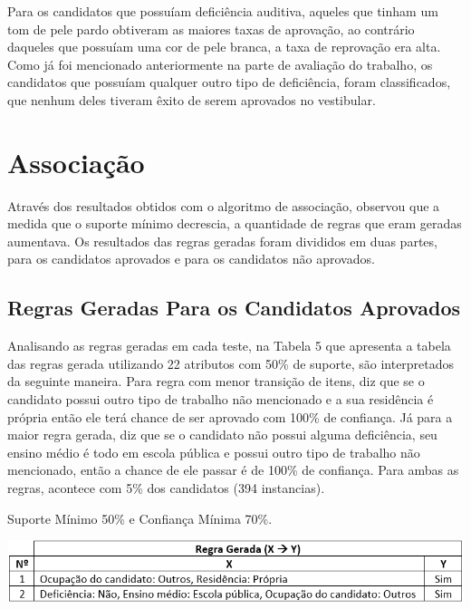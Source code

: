 \par
Para os candidatos que possuíam deficiência auditiva, aqueles que tinham um tom de pele pardo obtiveram as maiores taxas de aprovação, ao contrário daqueles que possuíam uma cor de pele branca, a taxa de reprovação era alta. Como já foi mencionado anteriormente na parte de avaliação do trabalho, os candidatos que possuíam qualquer outro tipo de deficiência, foram classificados, que nenhum deles tiveram êxito de serem aprovados no vestibular.


\section{Associação}

Através dos resultados obtidos com o algoritmo de associação, observou que a medida que o suporte mínimo decrescia, a quantidade de regras que eram geradas aumentava. Os resultados das regras geradas foram divididos em duas partes, para os candidatos aprovados e para os candidatos não aprovados.



\subsection{Regras Geradas Para os Candidatos Aprovados}

\par
Analisando as regras geradas em cada teste, na Tabela 5 que apresenta a tabela das regras gerada utilizando 22 atributos com 50\% de suporte, são interpretados da seguinte maneira. Para regra com menor transição de itens, diz que se o candidato possui outro tipo de trabalho não mencionado e a sua residência é própria então ele terá chance de ser aprovado com 100\% de confiança. Já para a maior regra gerada, diz que se o candidato não possui alguma deficiência, seu ensino médio é todo em escola pública e possui outro tipo de trabalho não mencionado, então a chance de ele passar é de 100\% de confiança. Para ambas as regras, acontece com 5\% dos candidatos (394 instancias).


\par
\begin{table}[!htp]
	\begin{center}
    \caption{\label{fig:waveform_fig} Suporte Mínimo 50\% e Confiança Mínima 70\%.}
	\includegraphics[scale=0.75]{Figuras/Suporte_50_atributos_22.png}
	\end{center}
\end{table}

